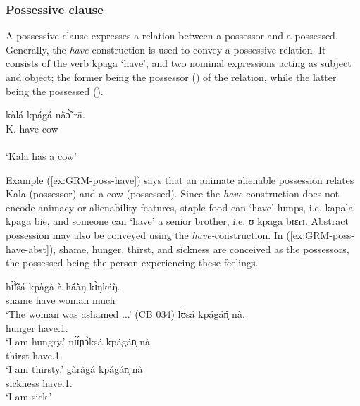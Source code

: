 \z 
 \z



\subsubsection{Possessive clause}
\label{sec:GRM-poss-cl}

A possessive clause expresses a relation between  a
possessor and a possessed.  Generally,  the  {\it
have-}construction  is used to convey a possessive relation. It consists of
the verb {\sls kpaga} `have',  and two nominal expressions acting as subject and
object; the former being the possessor (\psor) of the relation, while  the
latter being  the possessed
(\psed).

\ea\label{ex:GRM-poss-have}
\glll kàlá kpágá nã̀ɔ̃̀ rā.\\
K. have cow {\foc}\\
  {\psor} {}   {\psed} {}\\
\glt  `Kala has a cow'
\z

Example (\ref{ex:GRM-poss-have}) says that an animate alienable possession
relates  Kala (possessor) and a cow (possessed).  Since the  {\it
have-}construction does not encode animacy or alienability features,   staple
food can `have' lumps, i.e. {\sls kapala kpaga bie}, and someone can `have' a
senior brother, i.e. {\sls ʊ kpaga bɪɛrɪ}.  Abstract possession may also be
conveyed using the {\it have-}construction. In (\ref{ex:GRM-poss-have-abst}),
  shame, hunger,  thirst, and sickness are conceived as the possessors, the
possessed being the person experiencing these feelings. 



\ea\label{ex:GRM-poss-have-abst}

 \ea\label{ex:GRM-poss-have-abst-1}
\gll hɪ̃̀ɪ̃̀sá kpàgà   à   hã́ã̀ŋ kɪ̀ŋkáŋ̀.\\
shame    have {\art}   woman much\\
\glt `The woman was ashamed ...' (CB 034)
\ex\label{ex:GRM-poss-have-abst-2}
\gll lʊ̀sá kpágáń̩ nà.\\
hunger have.{1.\sg} {\foc}\\
\glt `I am hungry.'
\ex\label{ex:GRM-poss-have-abst-3}
\gll  nɪ́ɪ́ɲɔ̀ksá kpágán̩ nà\\
thirst have.{1.\sg} {\foc}\\
\glt  `I am thirsty.'
\ex\label{ex:GRM-poss-have-abst-4}
\gll  gàràgá kpágán̩ nà\\
sickness have.{1.\sg} {\foc}\\
\glt  `I am sick.'

